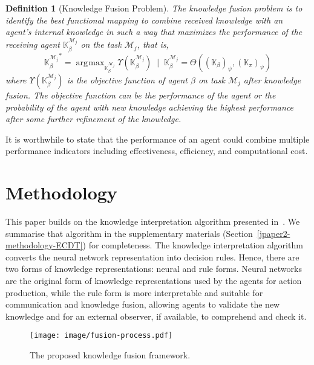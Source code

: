 \documentclass[lettersize,journal]{IEEEtran}
\DeclareMathOperator*{\argmax}{\arg\!\max}
\newtheorem{definition}{Definition}[section]
\begin{document}
\begin{definition}[Knowledge Fusion Problem]\label{def:knowledgefusion} \emph{The knowledge fusion problem is to identify the best functional mapping to combine received knowledge with an agent\textquoteright s internal knowledge in such a way that maximizes the performance of the receiving agent $\mathbb{K}^{\mathcal{M}_j}_\beta$ on the task $\mathcal{M}_j$, that is,}
\begin{equation}
    {\mathbb{K}^{\mathcal{M}_j}_\beta}^* = \argmax_{\mathbb{K}^{\mathcal{M}_j}_\beta} \Upsilon(\mathbb{K}^{\mathcal{M}_j}_\beta) \;\; | \;\;\mathbb{K}^{\mathcal{M}_j}_\beta = \Theta((\mathbb{K}_\beta)_\psi,(\mathbb{K}_\pi)_\psi)
\end{equation}
where $\Upsilon(\mathbb{K}^{\mathcal{M}_j}_\beta)$ is the objective function of agent $\beta$ on task $\mathcal{M}_j$ after knowledge fusion. The objective function can be the performance of the agent or the probability of the agent with new knowledge achieving the highest performance after some further refinement of the knowledge. 
\end{definition}

It is worthwhile to state that the performance of an agent could combine multiple performance indicators including effectiveness, efficiency, and computational cost.


\section{Methodology}\label{jpaper2-methodology}

This paper builds on the knowledge interpretation algorithm presented in~\cite{nguyen2020towards}. We summarise that algorithm in the supplementary materials (Section~\ref{jpaper2-methodology-ECDT}) for completeness.  The knowledge interpretation algorithm converts the neural network representation into decision rules. Hence, there are two forms of knowledge representations: neural and rule forms. Neural networks are the original form of knowledge representations used by the agents for action production, while the rule form is more interpretable and suitable for communication and knowledge fusion, allowing agents to validate the new knowledge and for an external observer, if available, to comprehend and check it. 

\begin{figure}[!b]
    \centering
    \texttt{[image: image/fusion-process.pdf]}
    \caption{The proposed knowledge fusion framework.}
    \label{fig:knowledgefusion}
\end{figure}
\end{document}

